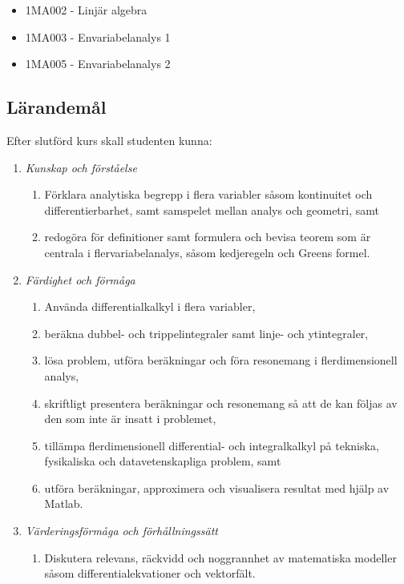 \begin{itemize}
\tightlist
\item
  1MA002 - Linjär algebra
\item
  1MA003 - Envariabelanalys 1
\item
  1MA005 - Envariabelanalys 2
\end{itemize}

\subsection*{Lärandemål}

Efter slutförd kurs skall studenten kunna:

\begin{enumerate}
\def\labelenumi{\Alph{enumi}.}
\tightlist
\item
  \emph{Kunskap och förståelse}

  \begin{enumerate}
  \def\labelenumii{\Alph{enumi}.\arabic{enumii}.}
  \tightlist
  \item
    Förklara analytiska begrepp i flera variabler såsom kontinuitet och
    differentierbarhet, samt samspelet mellan analys och geometri, samt
  \item
    redogöra för definitioner samt formulera och bevisa teorem som är
    centrala i flervariabelanalys, såsom kedjeregeln och Greens formel.
  \end{enumerate}
\item
  \emph{Färdighet och förmåga}

  \begin{enumerate}
  \def\labelenumii{\Alph{enumi}.\arabic{enumii}.}
  \tightlist
  \item
    Använda differentialkalkyl i flera variabler,
  \item
    beräkna dubbel- och trippelintegraler samt linje- och ytintegraler,
  \item
    lösa problem, utföra beräkningar och föra resonemang i
    flerdimensionell analys,
  \item
    skriftligt presentera beräkningar och resonemang så att de kan
    följas av den som inte är insatt i problemet,
  \item
    tillämpa flerdimensionell differential- och integralkalkyl på
    tekniska, fysikaliska och datavetenskapliga problem, samt
  \item
    utföra beräkningar, approximera och visualisera resultat med hjälp
    av Matlab.
  \end{enumerate}
\item
  \emph{Värderingsförmåga och förhållningssätt}

  \begin{enumerate}
  \def\labelenumii{\Alph{enumi}.\arabic{enumii}.}
  \tightlist
  \item
    Diskutera relevans, räckvidd och noggrannhet av matematiska modeller
    såsom differentialekvationer och vektorfält.
  \end{enumerate}
\end{enumerate}

